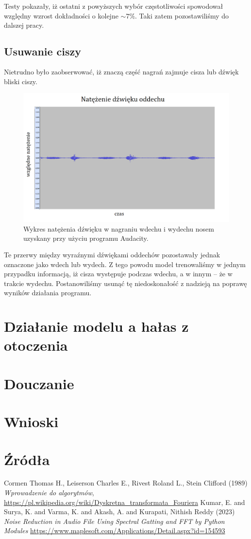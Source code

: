 \documentclass[polish]{article}
\begin{document}
Testy pokazały, iż ostatni z powyższych wybór częstotliwości spowodował względny wzrost dokładności o kolejne $\sim7\%$. Taki zatem pozostawiliśmy do dalszej pracy.
\subsection{Usuwanie ciszy}
Nietrudno było zaobserwować, iż znaczą część nagrań zajmuje cisza lub dźwięk bliski ciszy.
\begin{figure}[H]
	\centering
	\includegraphics[width=13cm]{natezenie_wydech_nosem}
	\caption{Wykres natężenia dźwięku w nagraniu wdechu i wydechu nosem uzyskany przy użyciu programu Audacity.}
\end{figure}
Te przerwy między wyraźnymi dźwiękami oddechów pozostawały jednak oznaczone jako wdech lub wydech. Z tego powodu model trenowaliśmy w jednym przypadku informacją, iż cisza występuje podczas wdechu, a w innym -- że w trakcie wydechu. Postanowiliśmy usunąć tę niedoskonałość z nadzieją na poprawę wyników działania programu.

\section{Działanie modelu a hałas z otoczenia}

\section{Douczanie}

\section{Wnioski}

\section{Źródła}
\begin{thebibliography}{2}
 Cormen Thomas H., Leiserson Charles E., Rivest Roland L., Stein Clifford (1989) \emph{Wprowadzenie do algorytmów},
\url{https://pl.wikipedia.org/wiki/Dyskretna_transformata_Fouriera}
Kumar, E. and Surya, K. and Varma, K. and Akash, A. and Kurapati, Nithish Reddy (2023) \emph{Noise Reduction in Audio File Using Spectral Gatting and FFT by Python Modules}
\url{https://www.maplesoft.com/Applications/Detail.aspx?id=154593}
\end{thebibliography}
\end{document}
